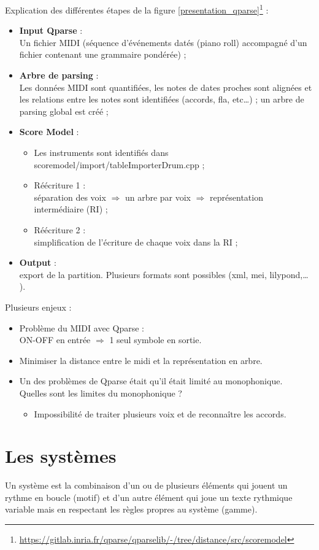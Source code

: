 Explication des différentes étapes de la figure \ref{presentation_qparse}\footnote{\url{https://gitlab.inria.fr/qparse/qparselib/-/tree/distance/src/scoremodel}} :
\begin{itemize}
	\item \textbf{Input Qparse} :\\
	Un fichier MIDI (séquence d’événements datés (piano roll) accompagné d’un fichier contenant une grammaire pondérée) ;
	\item \textbf{Arbre de parsing} :\\
	Les données MIDI sont quantifiées, les notes de dates proches sont alignées et les relations entre les notes sont identifiées (accords, fla, etc…) ; un arbre de parsing global est créé ;
	\item \textbf{Score Model} :
	\begin{itemize}
		\item Les instruments sont identifiés dans scoremodel/import/tableImporterDrum.cpp ;
		\item Réécriture 1 :\\
		séparation des voix $\Rightarrow$ un arbre par voix $\Rightarrow$ représentation intermédiaire (RI) ;
		\item Réécriture 2 :\\
		simplification de l’écriture de chaque voix dans la RI ;
	\end{itemize}
    \item \textbf{Output} :\\
    export de la partition. Plusieurs formats sont possibles (xml, mei, lilypond,… ).\\
\end{itemize}
Plusieurs enjeux :
\begin{itemize}
	\item Problème du MIDI avec Qparse :\\
	ON-OFF en entrée $\Rightarrow$ 1 seul symbole en sortie.
	\item Minimiser la distance entre le midi et la représentation en arbre.
	\item Un des problèmes de Qparse était qu’il était limité au monophonique.\\
	Quelles sont les limites du monophonique ?
	\begin{itemize}
		\item Impossibilité de traiter plusieurs voix et de reconnaître les accords.
	\end{itemize}
\end{itemize}
\section{Les systèmes}
\label{systemes_methodes}
Un système est la combinaison d’un ou de plusieurs éléments qui jouent un rythme en boucle (motif) et d’un autre élément qui joue un texte rythmique variable mais en respectant les règles propres au système (gamme).
